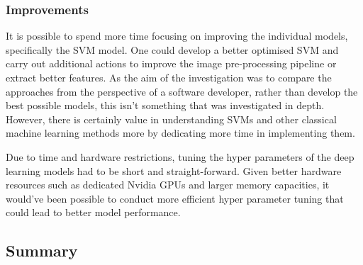 \documentclass[12pt,a4paper]{report}
\begin{document}
\subsubsection{Improvements}

It is possible to spend more time focusing on improving the individual models, specifically the SVM model. One could 
develop a better optimised SVM and carry out additional actions to improve the image pre-processing pipeline or extract 
better features. As the aim of the investigation was to compare the approaches from the perspective of a software 
developer, rather than develop the best possible models, this isn't something that was investigated in depth. However, 
there is certainly value in understanding SVMs and other classical machine learning methods more by dedicating more time
in implementing them.

\par

Due to time and hardware restrictions, tuning the hyper parameters of the deep learning models had to be short and 
straight-forward. Given better hardware resources such as dedicated Nvidia GPUs and larger memory capacities, 
it would've been possible to conduct more efficient hyper parameter tuning that could lead to better model performance.

\subsection{Summary}
\end{document}
